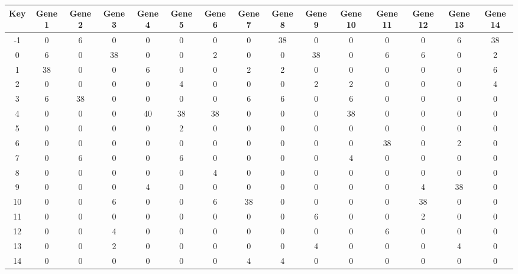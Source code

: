 \begin{tabular}{|c|c|c|c|c|c|c|c|c|c|c|c|c|c|c|}
\hline
Key & Gene 1 & Gene 2 & Gene 3 & Gene 4 & Gene 5 & Gene 6 & Gene 7 & Gene 8 & Gene 9 & Gene 10 & Gene 11 & Gene 12 & Gene 13 & Gene 14 \\
\hline
-1 & 0 & 6 & 0 & 0 & 0 & 0 & 0 & 38 & 0 & 0 & 0 & 0 & 6 & 38 \\
0 & 6 & 0 & 38 & 0 & 0 & 2 & 0 & 0 & 38 & 0 & 6 & 6 & 0 & 2 \\
1 & 38 & 0 & 0 & 6 & 0 & 0 & 2 & 2 & 0 & 0 & 0 & 0 & 0 & 6 \\
2 & 0 & 0 & 0 & 0 & 4 & 0 & 0 & 0 & 2 & 2 & 0 & 0 & 0 & 4 \\
3 & 6 & 38 & 0 & 0 & 0 & 0 & 6 & 6 & 0 & 6 & 0 & 0 & 0 & 0 \\
4 & 0 & 0 & 0 & 40 & 38 & 38 & 0 & 0 & 0 & 38 & 0 & 0 & 0 & 0 \\
5 & 0 & 0 & 0 & 0 & 2 & 0 & 0 & 0 & 0 & 0 & 0 & 0 & 0 & 0 \\
6 & 0 & 0 & 0 & 0 & 0 & 0 & 0 & 0 & 0 & 0 & 38 & 0 & 2 & 0 \\
7 & 0 & 6 & 0 & 0 & 6 & 0 & 0 & 0 & 0 & 4 & 0 & 0 & 0 & 0 \\
8 & 0 & 0 & 0 & 0 & 0 & 4 & 0 & 0 & 0 & 0 & 0 & 0 & 0 & 0 \\
9 & 0 & 0 & 0 & 4 & 0 & 0 & 0 & 0 & 0 & 0 & 0 & 4 & 38 & 0 \\
10 & 0 & 0 & 6 & 0 & 0 & 6 & 38 & 0 & 0 & 0 & 0 & 38 & 0 & 0 \\
11 & 0 & 0 & 0 & 0 & 0 & 0 & 0 & 0 & 6 & 0 & 0 & 2 & 0 & 0 \\
12 & 0 & 0 & 4 & 0 & 0 & 0 & 0 & 0 & 0 & 0 & 6 & 0 & 0 & 0 \\
13 & 0 & 0 & 2 & 0 & 0 & 0 & 0 & 0 & 4 & 0 & 0 & 0 & 4 & 0 \\
14 & 0 & 0 & 0 & 0 & 0 & 0 & 4 & 4 & 0 & 0 & 0 & 0 & 0 & 0 \\
\hline
\end{tabular}